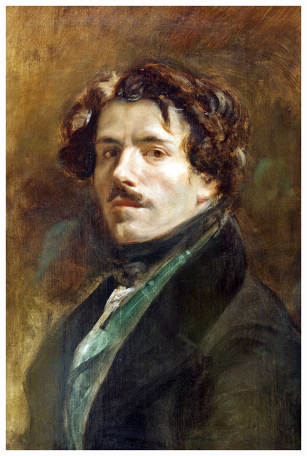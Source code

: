 \documentclass{article}
\begin{document}
\begin{figure}[!htb]
\centering
\begin{minipage}{0.25\textwidth}
\centering
\includegraphics[width=0.98\textwidth]{../Images/delacroix.jpg}
\end{minipage}%
\begin{minipage}{0.25\textwidth}
\centering

\end{minipage}
\end{figure}
\end{document}
